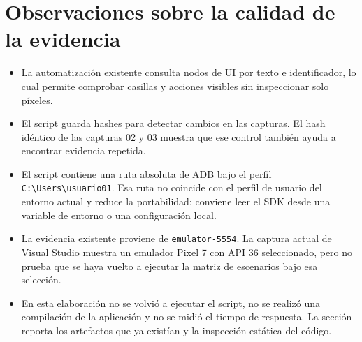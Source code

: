 \section{Observaciones sobre la calidad de la evidencia}
\begin{itemize}
  \item La automatización existente consulta nodos de UI por texto e identificador, lo cual permite comprobar casillas y acciones visibles sin inspeccionar solo píxeles.
  \item El script guarda hashes para detectar cambios en las capturas. El hash idéntico de las capturas 02 y 03 muestra que ese control también ayuda a encontrar evidencia repetida.
  \item El script contiene una ruta absoluta de ADB bajo el perfil \texttt{C:\textbackslash Users\textbackslash usuario01}. Esa ruta no coincide con el perfil de usuario del entorno actual y reduce la portabilidad; conviene leer el SDK desde una variable de entorno o una configuración local.
  \item La evidencia existente proviene de \texttt{emulator-5554}. La captura actual de Visual Studio muestra un emulador Pixel 7 con API 36 seleccionado, pero no prueba que se haya vuelto a ejecutar la matriz de escenarios bajo esa selección.
  \item En esta elaboración no se volvió a ejecutar el script, no se realizó una compilación de la aplicación y no se midió el tiempo de respuesta. La sección reporta los artefactos que ya existían y la inspección estática del código.
\end{itemize}

